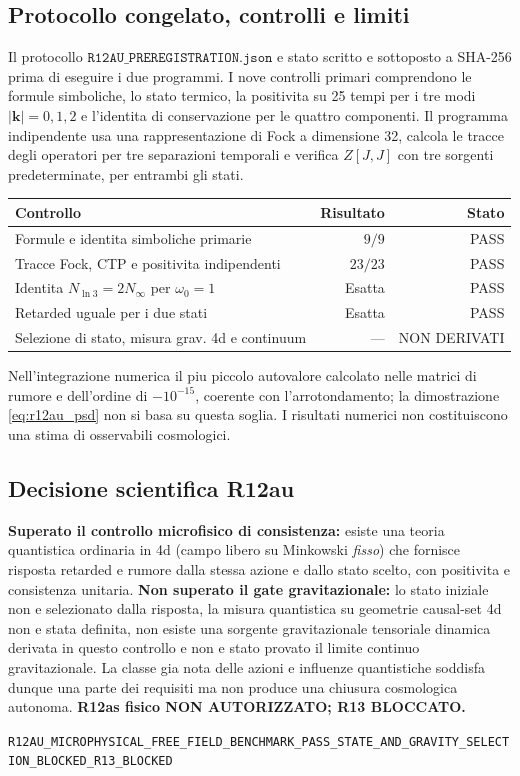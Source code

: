 \documentclass[11pt,a4paper]{article}
\begin{document}
\subsection{Protocollo congelato, controlli e limiti}
Il protocollo $\texttt{R12AU\_PREREGISTRATION.json}$ e stato scritto e sottoposto a SHA-256 prima di eseguire i due programmi. I nove controlli primari comprendono le formule simboliche, lo stato termico, la positivita su 25 tempi per i tre modi $|\mathbf k|=0,1,2$ e l'identita di conservazione per le quattro componenti. Il programma indipendente usa una rappresentazione di Fock a dimensione 32, calcola le tracce degli operatori per tre separazioni temporali e verifica $Z[J,J]$ con tre sorgenti predeterminate, per entrambi gli stati.
\begin{center}
\begin{tabular}{p{}rr}
\toprule
Controllo & Risultato & Stato\\
\midrule
Formule e identita simboliche primarie & $9/9$ & PASS\\
Tracce Fock, CTP e positivita indipendenti & $23/23$ & PASS\\
Identita $N_{\ln3}=2N_{\infty}$ per $\omega_0=1$ & Esatta & PASS\\
Retarded uguale per i due stati & Esatta & PASS\\
Selezione di stato, misura grav. 4d e continuum & --- & NON DERIVATI\\
\bottomrule
\end{tabular}
\end{center}
Nell'integrazione numerica il piu piccolo autovalore calcolato nelle matrici di rumore e dell'ordine di $-10^{-15}$, coerente con l'arrotondamento; la dimostrazione \eqref{eq:r12au_psd} non si basa su questa soglia. I risultati numerici non costituiscono una stima di osservabili cosmologici.

\subsection{Decisione scientifica R12au}
\textbf{Superato il controllo microfisico di consistenza:} esiste una teoria quantistica ordinaria in 4d (campo libero su Minkowski \emph{fisso}) che fornisce risposta retarded e rumore dalla stessa azione e dallo stato scelto, con positivita e consistenza unitaria. \textbf{Non superato il gate gravitazionale:} lo stato iniziale non e selezionato dalla risposta, la misura quantistica su geometrie causal-set 4d non e stata definita, non esiste una sorgente gravitazionale tensoriale dinamica derivata in questo controllo e non e stato provato il limite continuo gravitazionale. La classe gia nota delle azioni e influenze quantistiche soddisfa dunque una parte dei requisiti ma non produce una chiusura cosmologica autonoma. \textbf{R12as fisico NON AUTORIZZATO; R13 BLOCCATO.}
\begin{center}\small
\nolinkurl{R12AU_MICROPHYSICAL_FREE_FIELD_BENCHMARK_PASS_STATE_AND_GRAVITY_SELECTION_BLOCKED_R13_BLOCKED}
\end{center}
\end{document}
